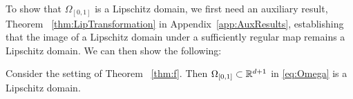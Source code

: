


To show that $\Omega_{[0,1]}$ is a Lipschitz domain, we first need an auxiliary result, Theorem ~\ref{thm:LipTransformation} in Appendix~\ref{app:AuxResults}, establishing that the image of a Lipschitz domain under a sufficiently regular map remains a Lipschitz domain. We can then show the following:
\begin{theorem}\label{thm:LipDomain}
  Consider the setting of Theorem ~\ref{thm:f}.  Then
    $\Omega_{[0,1]}\subset\mathbb{R}^{d+1}$ in \eqref{eq:Omega} is a Lipschitz
    domain.
\end{theorem}

